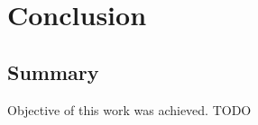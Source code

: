 
\chapter{Conclusion}\label{chapter:summary}

\section{Summary}

Objective of this work was achieved. TODO